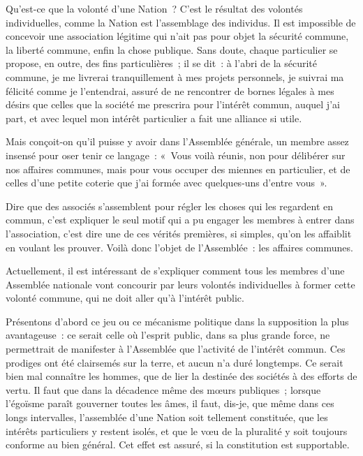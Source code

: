 \documentclass[french,twoside]{book} %
\begin{document}
Qu’est-ce que la volonté d’une Nation ? C’est le résultat des volontés individuelles, comme la Nation est l’assemblage des individus. Il est impossible de concevoir une association légitime qui n’ait pas pour objet la sécurité commune, la liberté commune, enfin la chose publique. Sans doute, chaque particulier se propose, en outre, des fins particulières ; il se dit : à l’abri de la sécurité commune, je me livrerai tranquillement à mes projets personnels, je suivrai ma félicité comme je l’entendrai, assuré de ne rencontrer de bornes légales à mes désirs que celles que la société me prescrira pour l’intérêt commun, auquel j’ai part, et avec lequel mon intérêt particulier a fait une alliance si utile.\par
Mais conçoit-on qu’il puisse y avoir dans l’Assemblée générale, un membre assez insensé pour oser tenir ce langage : « Vous voilà réunis, non pour délibérer sur nos affaires communes, mais pour vous occuper des miennes en particulier, et de celles d’une petite coterie que j’ai formée avec quelques-uns d’entre vous ».\par
Dire que des associés s’assemblent pour régler les choses qui les regardent en commun, c’est expliquer le seul motif qui a pu engager les membres à entrer dans l’association, c’est dire une de ces vérités premières, si simples, qu’on les affaiblit en voulant les prouver. Voilà donc l’objet de l’Assemblée : les affaires communes.\par
Actuellement, il est intéressant de s’expliquer comment tous les membres d’une Assemblée nationale vont concourir par leurs volontés individuelles à former cette volonté commune, qui ne doit aller qu’à l’intérêt public.\par
Présentons d’abord ce jeu ou ce mécanisme politique dans la supposition la plus avantageuse : ce serait celle où l’esprit public, dans sa plus grande force, ne permettrait de manifester à l’Assemblée que l’activité de l’intérêt commun. Ces prodiges ont été clairsemés sur la terre, et aucun n’a duré longtemps. Ce serait bien mal connaître les hommes, que de lier la destinée des sociétés à des efforts de vertu. Il faut que dans la décadence même des mœurs publiques ; lorsque l’égoïsme paraît gouverner toutes les âmes, il faut, dis-je, que même dans ces longs intervalles, l’assemblée d’une Nation soit tellement constituée, que les intérêts particuliers y restent isolés, et que le vœu de la pluralité y soit toujours conforme au bien général. Cet effet est assuré, si la constitution est supportable.\par
\end{document}
